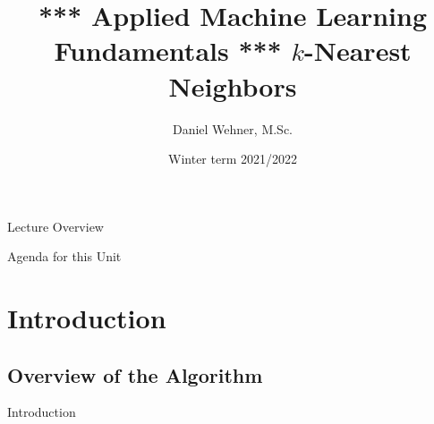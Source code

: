 


\title[$k$-Nearest Neighbors]{*** Applied Machine Learning Fundamentals *** $k$-Nearest Neighbors}
\author{Daniel Wehner, M.Sc.}
\date{Winter term 2021/2022}




\maketitlepage


\begin{frame}{Lecture Overview}{}
\end{frame}


\begin{frame}{Agenda for this Unit}
	\begin{multicols}{2}
		\tableofcontents
	\end{multicols}
\end{frame}


\section{Introduction}

\subsection{Overview of the Algorithm}

\begin{frame}{Introduction}{}
\end{frame}


